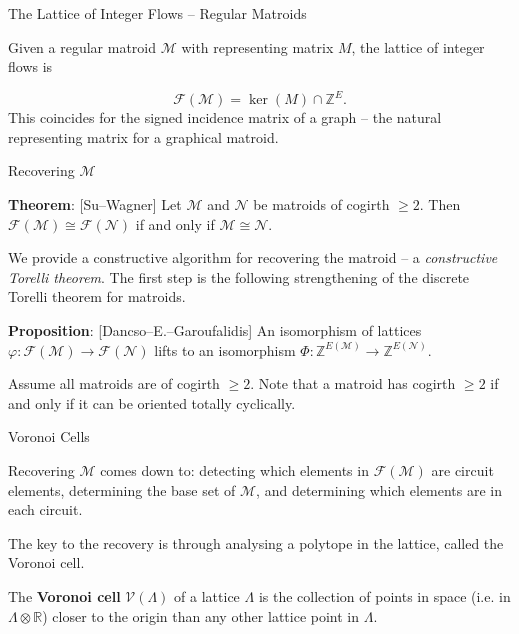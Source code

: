\documentclass[9pt]{beamer}
\def\calM{\mathcal M}
\def\calF{\mathcal F}
\def\calN{\mathcal N}
\def\calV{\mathcal V}
\def\Z{\mathbb Z}
\renewcommand{\theorem}[1]{\vspace{6pt}\textbf{Theorem}: #1\vspace{6pt}}
\newcounter{proposition}
\newcommand{\proposition}[1]{\textbf{Proposition}: #1}
\begin{document}
    \begin{frame}{The Lattice of Integer Flows -- Regular Matroids}
        
        Given a regular matroid $\calM$ with representing matrix $M$, the lattice of integer flows is

        \[\calF(\calM)=\ker(M)\cap\Z^E.\]
        This coincides for the signed incidence matrix of a graph -- the natural representing matrix for a graphical matroid.

    \end{frame}

    \begin{frame}{Recovering $\calM$}

        \theorem{[Su--Wagner] Let $\calM$ and $\calN$ be matroids of cogirth $\geq2$.
        Then $\calF(\calM)\cong\calF(\calN)$ if and only if $\calM\cong\calN$.}

        \pause

        \vspace{12pt}

        We provide a constructive algorithm for recovering the matroid -- a \textit{constructive Torelli theorem}.
        The first step is the following strengthening of the discrete Torelli theorem for matroids.

        \pause

        \vspace{12pt}

        \proposition{[Dancso--E.--Garoufalidis] An isomorphism of lattices $\varphi:\calF(\calM)\rightarrow\calF(\calN)$ lifts to an isomorphism $\Phi:\Z^{E(\calM)}\rightarrow\Z^{E(\calN)}$.}
        
        \pause

        \vspace{12pt}

        Assume all matroids are of cogirth $\geq2$.
        Note that a matroid has cogirth $\geq2$ if and only if it can be oriented totally cyclically.

    \end{frame}

    \begin{frame}{Voronoi Cells}

        Recovering $\calM$ comes down to: detecting which elements in $\calF(\calM)$ are circuit elements, determining the base set of $\calM$, and determining which elements are in each circuit.

        \pause

        \vspace{12pt}

        The key to the recovery is through analysing a polytope in the lattice, called the Voronoi cell.

        \pause

        \vspace{12pt}

        The \textbf{Voronoi cell} $\calV(\Lambda)$ of a lattice $\Lambda$ is the collection of points in space (i.e. in $\Lambda\otimes\mathbb{R}$) closer to the origin than any other lattice point in $\Lambda$.

    \end{frame}
\end{document}
